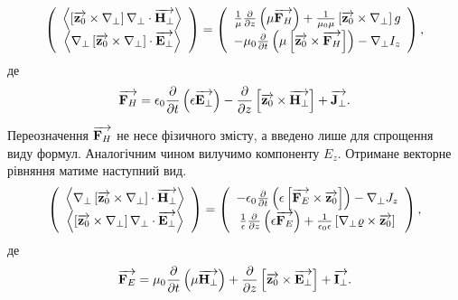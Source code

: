 %
\begin{equation} \label{eq:wboHinit}
\left( \begin{array}{c} 
\left< \left[ \overrightarrow{\mathbf z_0} \times \nabla_\perp \right] \nabla_\perp \cdot \overrightarrow{\mathbf H_\perp} \right> \\
\left< \nabla_\perp \left[ \overrightarrow{\mathbf z_0} \times \nabla_\perp \right] \cdot \overrightarrow{\mathbf E_\perp} \right> \\
\end{array} \right) = \left( \begin{array}{c} 
\frac{1}{\mu} \frac{\partial }{\partial z} \left( \mu \overrightarrow{\mathbf F_H} \right) +
\frac{1}{\mu_0 \mu} \left[ \overrightarrow{\mathbf z_0} \times \nabla_\perp \right] g \\
- \mu_0 \frac{\partial }{\partial t} \left( \mu \left[ \overrightarrow{\mathbf z_0} \times \overrightarrow{\mathbf F_H} \right] \right) -
\nabla_\perp I_z 
\end{array} \right),
\end{equation}
%
де
%
\begin{equation} \label{eq:F_H}
\overrightarrow{\mathbf F_H} = \epsilon_0 \frac{\partial }{\partial t} \left( \epsilon \overrightarrow{\mathbf E_\perp} \right) - 
\frac{\partial }{\partial z} \left[ \overrightarrow{\mathbf z_0} \times \overrightarrow{\mathbf H_\perp} \right] + \overrightarrow{\mathbf J_\perp}.
\end{equation}

Переозначення $ \overrightarrow{\mathbf F_H} $ не несе фізичного змісту, а введено лише для 
спрощення виду формул. Аналогічним чином вилучимо компоненту $ E_z $. 
Отримане векторне рівняння матиме наступний вид.
%
\begin{equation} \label{eq:wboEinit}
\left( \begin{array}{c} 
\left< \nabla_\perp \left[ \overrightarrow{\mathbf z_0} \times \nabla_\perp \right] \cdot \overrightarrow{\mathbf H_\perp} \right> \\
\left< \left[ \overrightarrow{\mathbf z_0} \times \nabla_\perp \right] \nabla_\perp \cdot \overrightarrow{\mathbf E_\perp} \right> \\
\end{array} \right) = \left( \begin{array}{c} 
- \epsilon_0 \frac{\partial }{\partial t} \left( \epsilon \left[ \overrightarrow{\mathbf F_E} \times \overrightarrow{\mathbf z_0} \right] 
\right) - \nabla_\perp J_z \\
\frac{1}{\epsilon} \frac{\partial }{\partial z} \left( \epsilon \overrightarrow{\mathbf F_E} \right) +
\frac{1}{\epsilon_0 \epsilon} \left[ \nabla_\perp \varrho \times \overrightarrow{\mathbf z_0} \right]
\end{array} \right),
\end{equation}
%
де
%
\begin{equation} \label{eq:F_E}
\overrightarrow{\mathbf F_E} = \mu_0 \frac{\partial }{\partial t} \left( \mu  \overrightarrow{\mathbf H_\perp} \right) +
\frac{\partial }{\partial z} \left[ \overrightarrow{\mathbf z_0} \times \overrightarrow{\mathbf E_\perp} \right] + \overrightarrow{\mathbf I_\perp}.
\end{equation}

